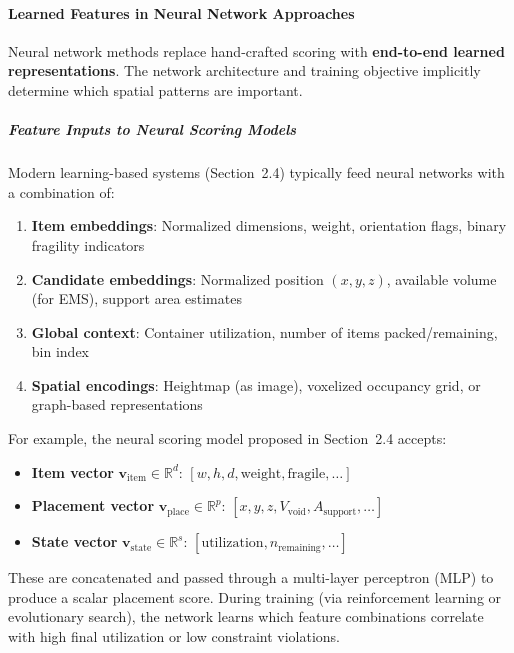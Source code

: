 \paragraph{Learned Features in Neural Network Approaches}

Neural network methods replace hand-crafted scoring with \textbf{end-to-end learned representations}. The network architecture and training objective implicitly determine which spatial patterns are important.

\subparagraph{Feature Inputs to Neural Scoring Models}

Modern learning-based systems (Section~2.4) typically feed neural networks with a combination of:

\begin{enumerate}
    \item \textbf{Item embeddings}: Normalized dimensions, weight, orientation flags, binary fragility indicators
    \item \textbf{Candidate embeddings}: Normalized position $(x, y, z)$, available volume (for EMS), support area estimates
    \item \textbf{Global context}: Container utilization, number of items packed/remaining, bin index
    \item \textbf{Spatial encodings}: Heightmap (as image), voxelized occupancy grid, or graph-based representations
\end{enumerate}

For example, the neural scoring model proposed in Section~2.4 accepts:

\begin{itemize}
    \item \textbf{Item vector} $\mathbf{v}_{\text{item}} \in \mathbb{R}^d$: $[w, h, d, \text{weight}, \text{fragile}, \ldots]$
    \item \textbf{Placement vector} $\mathbf{v}_{\text{place}} \in \mathbb{R}^p$: $[x, y, z, V_{\text{void}}, A_{\text{support}}, \ldots]$
    \item \textbf{State vector} $\mathbf{v}_{\text{state}} \in \mathbb{R}^s$: $[\text{utilization}, n_{\text{remaining}}, \ldots]$
\end{itemize}

These are concatenated and passed through a multi-layer perceptron (MLP) to produce a scalar placement score. During training (via reinforcement learning or evolutionary search), the network learns which feature combinations correlate with high final utilization or low constraint violations.

